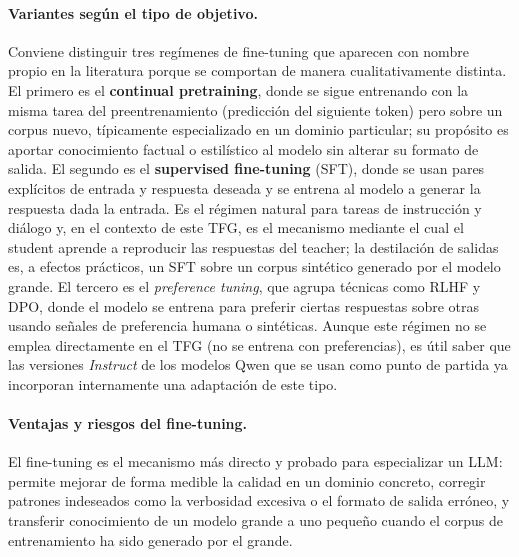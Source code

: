 \documentclass[11pt,a4paper]{article}
\begin{document}
\paragraph{Variantes según el tipo de objetivo.} Conviene distinguir tres regímenes de fine-tuning que aparecen con nombre propio en la literatura porque se comportan de manera cualitativamente distinta. El primero es el \textbf{continual pretraining}, donde se sigue entrenando con la misma tarea del preentrenamiento (predicción del siguiente token) pero sobre un corpus nuevo, típicamente especializado en un dominio particular; su propósito es aportar conocimiento factual o estilístico al modelo sin alterar su formato de salida. El segundo es el \textbf{supervised fine-tuning} (SFT), donde se usan pares explícitos de entrada y respuesta deseada y se entrena al modelo a generar la respuesta dada la entrada. Es el régimen natural para tareas de instrucción y diálogo y, en el contexto de este TFG, es el mecanismo mediante el cual el student aprende a reproducir las respuestas del teacher; la destilación de salidas es, a efectos prácticos, un SFT sobre un corpus sintético generado por el modelo grande. El tercero es el \textit{preference tuning}, que agrupa técnicas como RLHF y DPO, donde el modelo se entrena para preferir ciertas respuestas sobre otras usando señales de preferencia humana o sintéticas. Aunque este régimen no se emplea directamente en el TFG (no se entrena con preferencias), es útil saber que las versiones \textit{Instruct} de los modelos Qwen que se usan como punto de partida ya incorporan internamente una adaptación de este tipo.

\paragraph{Ventajas y riesgos del fine-tuning.} El fine-tuning es el mecanismo más directo y probado para especializar un LLM: permite mejorar de forma medible la calidad en un dominio concreto, corregir patrones indeseados como la verbosidad excesiva o el formato de salida erróneo, y transferir conocimiento de un modelo grande a uno pequeño cuando el corpus de entrenamiento ha sido generado por el grande.
\end{document}
